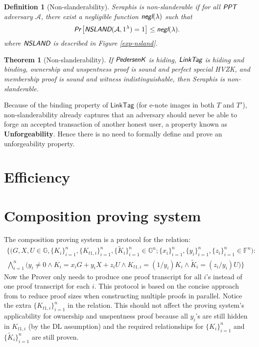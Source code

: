 \documentclass{article}
\newtheorem{definition}{Definition}[section]
\newtheorem{theorem}{Theorem}[section]
\begin{document}
\begin{definition}[Non-slanderability]
Seraphis is non-slanderable if for all $\emph{\textsf{PPT}}$ adversary $\mathcal{A}$, there exist a negligible function $\emph{\textsf{negl}}(\lambda)$ such that
\begin{align*}
\emph{\textsf{Pr}}
\left[
\emph{\textsf{NSLAND}}(\mathcal{A}, 1^{\lambda})=1
\right]
\le \emph{\textsf{negl}}(\lambda).
\end{align*}
where $\emph{\textsf{NSLAND}}$ is described in Figure \ref{exp-nsland}.
\end{definition}
\begin{theorem}[Non-slanderability]\label{thm-nsland}
If $\emph{\textsf{PedersenK}}$ is hiding, $\emph{\textsf{LinkTag}}$ is hiding and binding, ownership and unspentness proof is sound and perfect special HVZK, and membership proof is sound and witness indistinguishable, then Seraphis is non-slanderable.
\end{theorem}
Because of the binding property of $\textsf{LinkTag}$ (for e-note images in both $T$ and $T'$), non-slanderability already captures that an adversary should never be able to forge an accepted transaction of another honest user, a property known as \textbf{Unforgeability}. Hence there is no need to formally define and prove an unforgeability property.


\section{Efficiency}




\appendix

\section{Composition proving system}\label{comp-prov}
The composition proving system is a protocol for the relation:
\begin{multline*}
\Big\{\big(G, X, U\in\mathbb{G}, \{K_i\}_{i=1}^n, \{K_{t1,i}\}_{i=1}^n, \{\tilde{K}_i\}_{i=1}^n \in\mathbb{G}^n; \{x_i\}_{i=1}^n, \{y_i\}_{i=1}^n, \{z_i\}_{i=1}^n \in\mathbb{F}^n\big): \\ \bigwedge_{i=1}^n{\big(y_i \ne 0 \wedge K_i = x_i G + y_i X + z_i U \wedge K_{t1,i} = (1/y_i)K_i \wedge \tilde{K}_i = (z_i/y_i)U\big)} \Big\}
\end{multline*}
Now the Prover only needs to produce one proof transcript for all $i$'s instead of one proof transcript for each $i$. This protocol is based on the concise approach from \cite{clsag} to reduce proof sizes when constructing multiple proofs in parallel. Notice the extra $\{K_{t1,i}\}_{i=1}^n$ in the relation. This should not affect the proving system's applicability for ownership and unspentness proof because all $y_i$'s are still hidden in $K_{t1,i}$ (by the DL assumption) and the required relationships for $\{K_i\}_{i=1}^n$ and $\{\tilde{K}_i\}_{i=1}^n$ are still proven.
\end{document}
